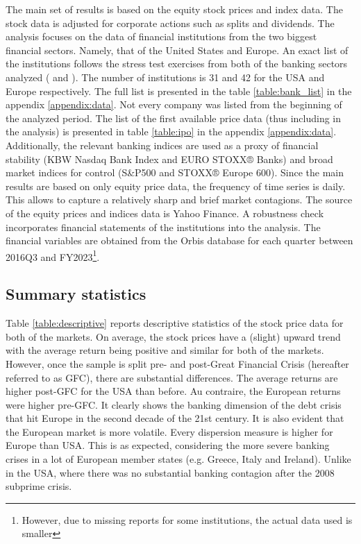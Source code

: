 \documentclass[12pt]{article}
\begin{document}
The main set of results is based on the equity stock prices and index data. The stock data is adjusted for corporate actions such as splits and dividends. The analysis focuses on the data of financial institutions from the two biggest financial sectors. Namely, that of the United States and Europe. An exact list of the institutions follows the stress test exercises from both of the banking sectors analyzed (\cite{eba2021} and \cite{fed21}). The number of institutions is 31 and 42 for the USA and Europe respectively. The full list is presented in the table \ref{table:bank_list} in the appendix \ref{appendix:data}. Not every company was listed from the beginning of the analyzed period. The list of the first available price data (thus including in the analysis) is presented in table \ref{table:ipo} in the appendix \ref{appendix:data}. Additionally, the relevant banking indices are used as a proxy of financial stability (KBW Nasdaq Bank Index and EURO STOXX® Banks) and broad market indices for control (S\&P500 and STOXX® Europe 600). Since the main results are based on only equity price data, the frequency of time series is daily. This allows to capture a relatively sharp and brief market contagions. The source of the equity prices and indices data is Yahoo Finance.  A robustness check incorporates financial statements of the institutions into the analysis. The financial variables are obtained from the Orbis database for each quarter between 2016Q3 and FY2023\footnote{However, due to missing reports for some institutions, the actual data used is smaller}. 

\subsection{Summary statistics}\label{subsection:data_descrptive}

Table \ref{table:descriptive} reports descriptive statistics of the stock price data for both of the markets. On average, the stock prices have a (slight) upward trend with the average return being positive and similar for both of the markets. However, once the sample is split pre- and post-Great Financial Crisis (hereafter referred to as GFC), there are substantial differences. The average returns are higher post-GFC for the USA than before. Au contraire, the European returns were higher pre-GFC. It clearly shows the banking dimension of the debt crisis that hit Europe in the second decade of the 21st century. It is also evident that the European market is more volatile. Every dispersion measure is higher for Europe than USA. This is as expected, considering the more severe banking crises in a lot of European member states (e.g. Greece, Italy and Ireland). Unlike in the USA, where there was no substantial banking contagion after the 2008 subprime crisis. 
\end{document}
